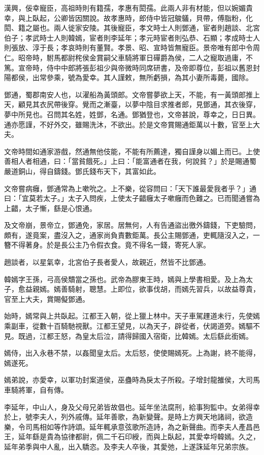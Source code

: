 
\begin{pinyinscope}
漢興，佞幸寵臣，高祖時則有籍孺，孝惠有閎孺。此兩人非有材能，但以婉媚貴幸，與上臥起，公卿皆因關說。故孝惠時，郎侍中皆冠鵔鸃，貝帶，傅脂粉，化閎、籍之屬也。兩人徙家安陵。其後寵臣，孝文時士人則鄧通，宦者則趙談、北宮伯子；孝武時士人則韓嫣，宦者則李延年；孝元時宦者則弘恭、石顯；孝成時士人則張放、淳于長；孝哀時則有董賢。孝景、昭、宣時皆無寵臣。景帝唯有郎中令周仁。昭帝時，駙馬都尉秺侯金賞嗣父車騎將軍日磾爵為侯，二人之寵取過庸，不篤。宣帝時，侍中中郎將張彭祖少與帝微時同席研書，及帝即尊位，彭祖以舊恩封陽都侯，出常參乘，號為愛幸。其人謹敕，無所虧損，為其小妻所毒薨，國除。

鄧通，蜀郡南安人也，以濯船為黃頭郎。文帝嘗夢欲上天，不能，有一黃頭郎推上天，顧見其衣尻帶後穿。覺而之漸臺，以夢中陰目求推者郎，見鄧通，其衣後穿，夢中所見也。召問其名姓，姓鄧，名通。鄧猶登也，文帝甚說，尊幸之，日日異。通亦愿謹，不好外交，雖賜洗沐，不欲出。於是文帝賞賜通鉅萬以十數，官至上大夫。

文帝時間如通家游戲，然通無他伎能，不能有所薦達，獨自謹身以媚上而已。上使善相人者相通，曰：「當貧餓死。」上曰：「能富通者在我，何說貧？」於是賜通蜀嚴道銅山，得自鑄錢。鄧氏錢布天下，其富如此。

文帝嘗病癰，鄧通常為上嗽吮之。上不樂，從容問曰：「天下誰最愛我者乎？」通曰：「宜莫若太子。」太子入問疾，上使太子齰癰太子嗽癰而色難之。已而聞通嘗為上齰，太子慚，繇是心恨通。

及文帝崩，景帝立，鄧通免，家居。居無何，人有告通盜出徼外鑄錢，下吏驗問，頗有，遂竟案，盡沒入之，通家尚負責數鉅萬。長公主賜鄧通，吏輒隨沒入之，一簪不得著身。於是長公主乃令假衣食。竟不得名一錢，寄死人家。

趙談者，以星氣幸，北宮伯子長者愛人，故親近，然皆不比鄧通。

韓嫣字王孫，弓高侯穨當之孫也。武帝為膠東王時，嫣與上學書相愛。及上為太子，愈益親嫣。嫣善騎射，聰慧。上即位，欲事伐胡，而嫣先習兵，以故益尊貴，官至上大夫，賞賜儗鄧通。

始時，嫣常與上共臥起。江都王入朝，從上獵上林中。天子車駕䟆道未行，先使嫣乘副車，從數十百騎馳視獸。江都王望見，以為天子，辟從者，伏謁道旁。嫣驅不見。既過，江都王怒，為皇太后泣，請得歸國入宿衛，比韓嫣。太后繇此銜嫣。

嫣侍，出入永巷不禁，以姦聞皇太后。太后怒，使使賜嫣死。上為謝，終不能得，嫣遂死。

嫣弟說，亦愛幸，以軍功封案道侯，巫蠱時為戾太子所殺。子增封龍雒侯，大司馬車騎將軍，自有傳。

李延年，中山人，身及父母兄弟皆故倡也。延年坐法腐刑，給事狗監中。女弟得幸於上，號李夫人，列外戚傳。延年善歌，為新變聲。是時上方興天地諸祠，欲造樂，令司馬相如等作詩頌。延年輒承意弦歌所造詩，為之新聲曲。而李夫人產昌邑王，延年繇是貴為協律都尉，佩二千石印綬，而與上臥起，其愛幸埒韓嫣。久之，延年弟季與中人亂，出入驕恣。及李夫人卒後，其愛弛，上遂誅延年兄弟宗族。


\end{pinyinscope}
